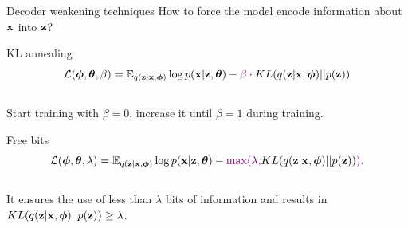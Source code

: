 \begin{frame}{Decoder weakening techniques}
	How to force the model encode information about $\mathbf{x}$ into $\mathbf{z}$?
	\begin{block}{KL annealing}
		\vspace{-0.3cm}
		\[
		    \mathcal{L}(\boldsymbol{\phi}, \boldsymbol{\theta}, \beta) = \mathbb{E}_{q(\mathbf{z} | \mathbf{x}, \boldsymbol{\phi})} \log p(\mathbf{x} | \mathbf{z}, \boldsymbol{\theta}) - {\color{violet}\beta} \cdot KL (q(\mathbf{z} | \mathbf{x}, \boldsymbol{\phi}) || p(\mathbf{z}))
		\]
		\vspace{-0.3cm} \\
		Start training with $\beta = 0$, increase it until $\beta = 1$ during training.
	\end{block}
	\begin{block}{Free bits}
		\vspace{-0.3cm}
		\[
		    \mathcal{L}(\boldsymbol{\phi}, \boldsymbol{\theta}, \lambda) = \mathbb{E}_{q(\mathbf{z} | \mathbf{x}, \boldsymbol{\phi})} \log p(\mathbf{x} | \mathbf{z}, \boldsymbol{\theta}) - {\color{violet}\max(\lambda,} KL (q(\mathbf{z} | \mathbf{x}, \boldsymbol{\phi}) || p(\mathbf{z})){\color{violet})}.
		\]
		\vspace{-0.3cm} \\
		It ensures the use of less than $\lambda$ bits of information and results in $KL (q(\mathbf{z} | \mathbf{x}, \boldsymbol{\phi}) || p(\mathbf{z})) \geq \lambda$.
	\end{block}
\end{frame}

